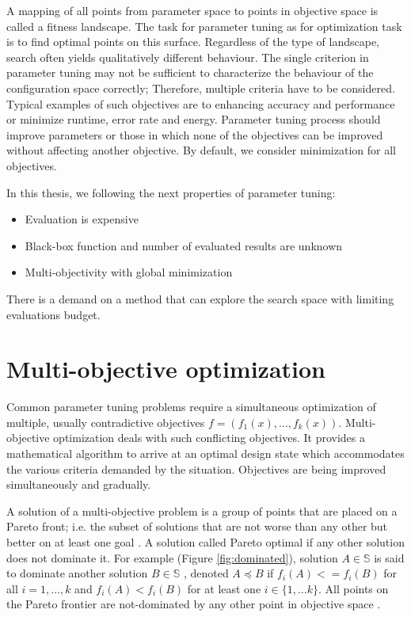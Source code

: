 
        A mapping of all points from parameter space to points in objective space is called a fitness landscape. The task for parameter tuning as for optimization task is to find optimal points on this surface. Regardless of the type of landscape, search often yields qualitatively different behaviour.
        The single criterion in parameter tuning may not be sufficient to characterize the behaviour of the configuration space correctly; Therefore, multiple criteria have to be considered. Typical examples of such objectives are to enhancing accuracy and performance or minimize runtime, error rate and energy. Parameter tuning process should improve parameters or those in which none of the objectives can be improved without affecting another objective. By default, we consider minimization for all objectives. 

        In this thesis, we following the next properties of parameter tuning:
        \begin{itemize}
            \item Evaluation is expensive
            \item Black-box function and number of evaluated results are unknown
            \item Multi-objectivity with global minimization
        \end{itemize}

        There is a demand on a method that can explore the search space with limiting evaluations budget. 
    

    \section{Multi-objective optimization}
        Common parameter tuning problems require a simultaneous optimization of multiple, usually contradictive objectives $f = (f_1(x), \ldots, f_k(x))$. Multi-objective optimization deals with such conflicting objectives. It provides a mathematical algorithm to arrive at an optimal design state which accommodates the various criteria demanded by the situation. Objectives are being improved simultaneously and gradually.

        A solution of a multi-objective problem is a group of points that are placed on a Pareto front; i.e. the subset of solutions that are not worse than any other but better on at least one goal \cite{KrallMD15}. A solution called Pareto optimal if any other solution does not dominate it. For example (Figure \ref{fig:dominated}), solution $A \in \mathbb{S}$ is said to dominate another solution $B \in \mathbb{S}$ , denoted $A \preceq B$ if $f_i(A)<=f_i(B)$ for all $i=1, \ldots ,k$ and $f_i(A)<f_i(B)$ for at least one $i \in \{1, \ldots k\}$. All points on the Pareto frontier are not-dominated by any other point in objective space \cite{Kaisa0021267}.  

